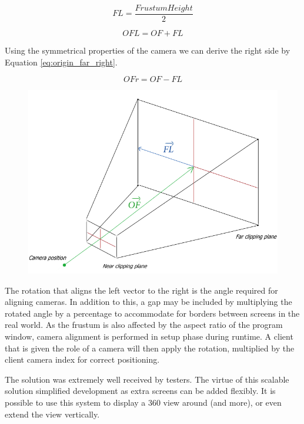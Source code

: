 \documentclass[a4paper,11pt]{article}
\begin{document}
\begin{equation}
	FL =\frac{Frustum Height}{2}
    \label{eq:centre_to_left}
\end{equation}

\begin{equation}
	OFL = OF + FL
    \label{eq:origin_far_left}
\end{equation}

Using the symmetrical properties of the camera we can derive the right side by Equation \ref{eq:origin_far_right}.

\begin{equation}
	OFr = OF - FL
	\label{eq:origin_far_right}
\end{equation}

\begin{figure}[ht]
	\centering
	\includegraphics[scale=0.4]{images/frustum}
    \label{fig:frustum}
\end{figure}

The rotation that aligns the left vector to the right is the angle required for aligning cameras. In addition to this, a gap may be included by multiplying the rotated angle by a percentage to accommodate for  borders between screens in the real world. As the frustum is also affected by the aspect ratio of the program window, camera alignment is performed in setup phase during runtime. A client that is given the role of a camera will then apply the rotation, multiplied by the client camera index for correct positioning.

The solution was extremely well received by testers. The virtue of this scalable solution simplified development as extra screens can be added flexibly. It is possible to use this system to display a 360 view around (and more), or even extend the view vertically.
\end{document}
